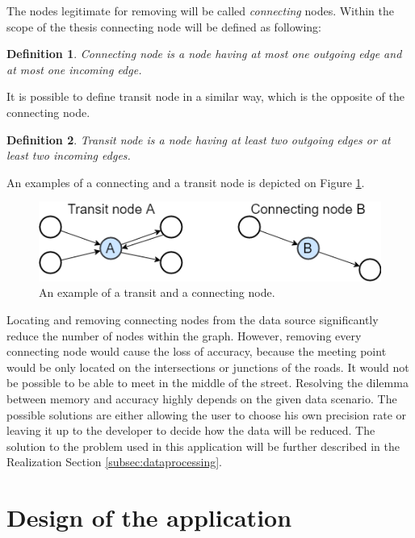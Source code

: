 \documentclass[thesis=M,english]{FITthesis}[2012/10/20]
\newtheorem{defin}{Definition}
\begin{document}
The nodes legitimate for removing will be called \textit{connecting} nodes. Within the scope of the thesis connecting node will be defined as following:

\begin{defin}
\label{def:connect}
Connecting node is a node having at most one outgoing edge and at most one incoming edge. 
\end{defin}

It is possible to define transit node in a similar way, which is the opposite of the connecting node. 

\begin{defin}
\label{def:transit}
Transit node is a node having at least two outgoing edges or at least two incoming edges. 
\end{defin}

An examples of a connecting and a transit node is depicted on Figure \ref{pic:CaTnodes}.

\begin{figure}[H]
\centering
\includegraphics[width=1\textwidth]{pics/CaTNodes}
\caption{An example of a transit and a connecting node.}
\label{pic:CaTnodes}
\end{figure}


Locating and removing connecting nodes from the data source significantly reduce the number of nodes within the graph. However, removing every connecting node would cause the loss of accuracy, because the meeting point would be only located on the intersections or junctions of the roads. It would not be possible to be able to meet in the middle of the street. 
Resolving the dilemma between memory and accuracy highly depends on the given data scenario. The possible solutions are either allowing the user to choose his own precision rate or leaving it up to the developer to decide how the data will be reduced. The solution to the problem used in this application will be further described in the Realization Section \ref{subsec:dataprocessing}.

\chapter{Design of the application}
\label{ch:DOTA}
\end{document}

